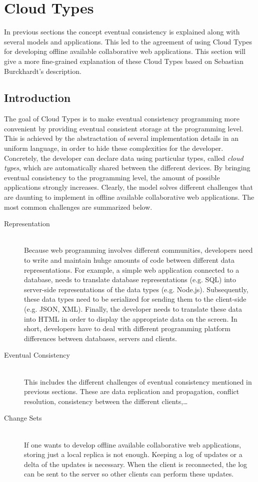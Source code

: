 \documentclass[a4paper,12pt]{report}
\begin{document}
\chapter{Cloud Types}\label{cha:CloudTypes} %

In previous sections the concept eventual consistency is explained along with several models and applications. This led to the agreement of using Cloud Types for developing offline available collaborative web applications. This section will give a more fine-grained explanation of these Cloud Types based on Sebastian Burckhardt's description.

\section{Introduction}\label{sec:Introduction}

The goal of Cloud Types is to make eventual consistency programming more convenient by providing eventual consistent storage at the programming level. This is achieved by the abstractation of several implementation details in an uniform language, in order to hide these complexities for the developer. Concretely, the developer can declare data using particular types, called \textit{cloud types}, which are automatically shared between the different devices. By bringing eventual consistency to the programming level, the amount of possible applications strongly increases. Clearly, the model solves different challenges that are daunting to implement in offline available collaborative web applications. The most common challenges are summarized below.

\begin{description}
    \item[Representation] \hfill \\Because web programming involves different communities, developers need to write and maintain huhge amounts of code between different data representations. For example, a simple web application connected to a database, needs to translate database representations (e.g. SQL) into server-side representations of the data types (e.g. Node.js). Subsequently, these data types need to be serialized for sending them to the client-side (e.g. JSON, XML). Finally, the developer needs to translate these data into HTML in order to display the appropriate data on the screen. In short, developers have to deal with different programming platform differences between databases, servers and clients. 
    \item[Eventual Consistency] \hfill \\This includes the different challenges of eventual consistency mentioned in previous sections. These are data replication and propagation, conflict resolution, consistency between the different clients,\ldots
    \item[Change Sets] \hfill \\If one wants to develop offline available collaborative web applications, storing just a local replica is not enough. Keeping a log of updates or a delta of the updates is necessary. When the client is reconnected, the log can be sent to the server so other clients can perform these updates.
\end{description}
\end{document}
